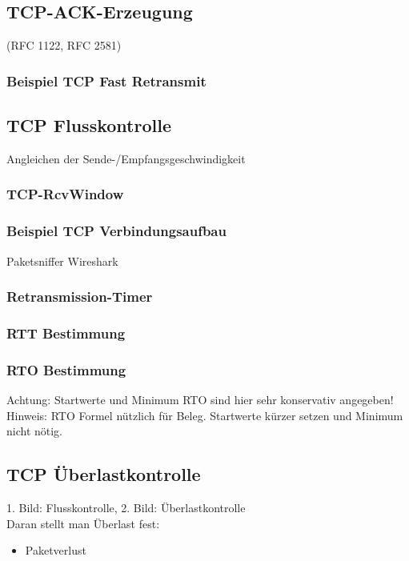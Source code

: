 \subsection{TCP-ACK-Erzeugung}
(RFC 1122, RFC 2581)
\subsubsection{Beispiel TCP Fast Retransmit}

\subsection{TCP Flusskontrolle}
Angleichen der Sende-/Empfangsgeschwindigkeit
\subsubsection{TCP-RcvWindow}
\subsubsection{Beispiel TCP Verbindungsaufbau}
Paketsniffer Wireshark
\subsubsection{Retransmission-Timer}
\subsubsection*{RTT Bestimmung}
\subsubsection*{RTO Bestimmung}
Achtung: Startwerte und Minimum RTO sind hier sehr konservativ angegeben!\\
Hinweis: RTO Formel nützlich für Beleg. Startwerte kürzer setzen und Minimum nicht nötig.

\subsection{TCP Überlastkontrolle}
1. Bild: Flusskontrolle, 2. Bild: Überlastkontrolle\\
Daran stellt man Überlast fest:
\begin{itemize}
\item Paketverlust
\end{itemize}
